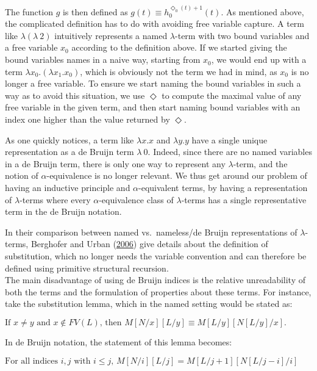 \documentclass[a4paper, 12pt, twoside]{style/ociamthesis}
\theoremstyle{plain}
\theoremstyle{definition}
\theoremstyle{remark}
\begin{document}
The function \(g\) is then defined as
\(g(t) \equiv h_0^{\Diamond_0(t)+1}(t)\). As mentioned above, the
complicated definition has to do with avoiding free variable capture. A
term like \(\lambda (\lambda\ 2)\) intuitively represents a named
\(\lambda\)-term with two bound variables and a free variable \(x_0\)
according to the definition above. If we started giving the bound
variables names in a naive way, starting from \(x_0\), we would end up
with a term \(\lambda x_0.(\lambda x_1.x_0)\), which is obviously not
the term we had in mind, as \(x_0\) is no longer a free variable. To
ensure we start naming the bound variables in such a way as to avoid
this situation, we use \(\Diamond\) to compute the maximal value of any
free variable in the given term, and then start naming bound variables
with an index one higher than the value returned by \(\Diamond\).

As one quickly notices, a term like \(\lambda x.x\) and \(\lambda y.y\)
have a single unique representation as a de Bruijn term \(\lambda\ 0\).
Indeed, since there are no named variables in a de Bruijn term, there is
only one way to represent any \(\lambda\)-term, and the notion of
\(\alpha\)-equivalence is no longer relevant. We thus get around our
problem of having an inductive principle and \(\alpha\)-equivalent
terms, by having a representation of \(\lambda\)-terms where every
\(\alpha\)-equivalence class of \(\lambda\)-terms has a single
representative term in the de Bruijn notation.

In their comparison between named vs.~nameless/de Bruijn representations
of \(\lambda\)-terms, Berghofer and Urban
(\protect\hyperlink{ref-berghofer06}{2006}) give details about the
definition of substitution, which no longer needs the variable
convention and can therefore be defined using primitive structural
recursion.\\
The main disadvantage of using de Bruijn indices is the relative
unreadability of both the terms and the formulation of properties about
these terms. For instance, take the substitution lemma, which in the
named setting would be stated as:

\begin{center}
$\text{If }x \neq y\text{ and }x \not\in FV(L)\text{, then }
M[N/x][L/y] \equiv M[L/y][N[L/y]/x].$
\end{center}

In de Bruijn notation, the statement of this lemma becomes:

\begin{center}
$\text{For all indices }i, j\text{ with }i \leq j\text{, }M[N/i][L/j] = M[L/j + 1][N[L/j - i]/i]$
\end{center}
\end{document}
